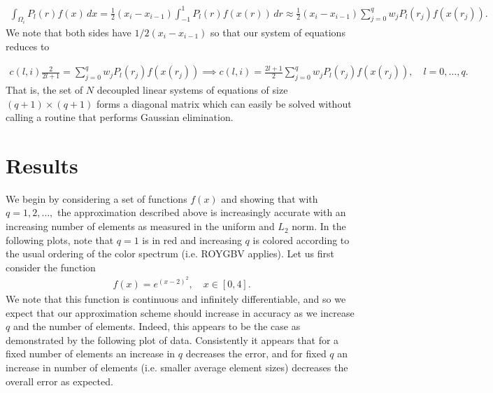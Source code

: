 \documentclass{article}
\begin{document}
  \begin{align*}
    \int_{\Omega_i} P_l(r) f(x) \, dx = \frac{1}{2} \left( x_i - x_{i-1}\right) \int_{-1}^1 P_l(r) f(x(r)) \, dr \approx \frac{1}{2} \left( x_i - x_{i-1}\right)\sum_{j=0}^q w_j P_l(r_j) f(x(r_j)).
  \end{align*}
We note that both sides have $1/2 \left( x_i - x_{i-1}\right)$ so that our system of equations reduces to 

  \begin{align*}
    c(l,i) \frac{2}{2l + 1} = \sum_{j=0}^q w_j P_l(r_j) f(x(r_j)) \implies c(l,i) = \frac{2l + 1}{2} \sum_{j=0}^q w_j P_l(r_j) f(x(r_j)), \quad l = 0,\dots, q .
  \end{align*}
That is, the set of $N$ decoupled linear systems of equations of size $(q+1)\times(q+1)$ forms a diagonal matrix which can easily be solved without calling a routine that performs Gaussian elimination.

\section{Results}
We begin by considering a set of functions $f(x)$ and showing that with $q=1,2,\dots,$ the approximation described above is increasingly accurate with an increasing number of elements as measured in the uniform and $L_2$ norm. In the following plots, note that $q = 1$ is in red and increasing $q$ is colored according to the usual ordering of the color spectrum (i.e. ROYGBV applies). Let us first consider the function
  \begin{align*}
    f(x) = e^{\left( x - 2\right)^2}, \quad x\in \left[ 0,4\right].
  \end{align*}
We note that this function is continuous and infinitely differentiable, and so we expect that our approximation scheme should increase in accuracy as we increase $q$ and the number of elements. Indeed, this appears to be the case as demonstrated by the following plot of data. Consistently it appears that for a fixed number of elements an increase in $q$ decreases the error, and for fixed $q$ an increase in number of elements (i.e. smaller average element sizes) decreases the overall error as expected.
\end{document}
